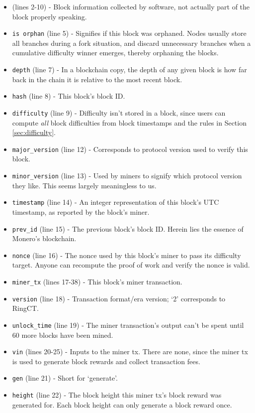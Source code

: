 \begin{appendices}
\begin{itemize}
	\item (lines 2-10) - Block information collected by software, not actually part of the block properly speaking.
    \item {\tt is orphan} (line 5) - Signifies if this block was orphaned. Nodes usually store all branches during a fork situation, and discard unnecessary branches when a cumulative difficulty winner emerges, thereby orphaning the blocks.
    \item {\tt depth} (line 7) - In a blockchain copy, the depth of any given block is how far back in the chain it is relative to the most recent block.
    \item {\tt hash} (line 8) - This block's block ID.
    \item {\tt difficulty} (line 9) - Difficulty isn't stored in a block, since users can compute {\em all} block difficulties from block timestamps and the rules in Section \ref{sec:difficulty}.
    \item {\tt major\_version} (line 12) - Corresponds to protocol version used to verify this block.
    \item {\tt minor\_version} (line 13) - Used by miners to signify which protocol version they like. This seems largely meaningless to us.
    \item {\tt timestamp} (line 14) - An integer representation of this block's UTC timestamp, as reported by the block's miner.
    \item {\tt prev\_id} (line 15) - The previous block's block ID. Herein lies the essence of Monero's blockchain.
    \item {\tt nonce} (line 16) - The nonce used by this block's miner to pass its difficulty target. Anyone can recompute the proof of work and verify the nonce is valid.
    \item {\tt miner\_tx} (lines 17-38) - This block's miner transaction.
    \item {\tt version} (line 18) - Transaction format/era version; `2' corresponds to RingCT.
    \item {\tt unlock\_time} (line 19) - The miner transaction's output can't be spent until 60 more blocks have been mined.
    \item {\tt vin} (lines 20-25) - Inputs to the miner tx. There are none, since the miner tx is used to generate block rewards and collect transaction fees.
    \item {\tt gen} (line 21) - Short for `generate'.
    \item {\tt height} (line 22) - The block height this miner tx's block reward was generated for. Each block height can only generate a block reward once.

\end{itemize}
\end{appendices}
